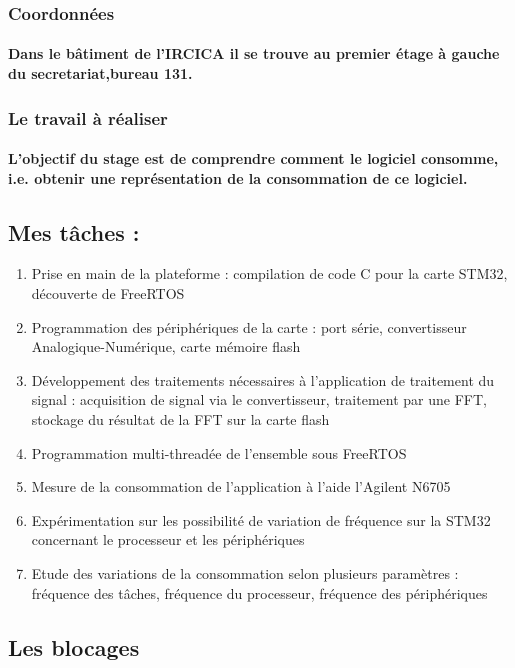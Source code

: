 \documentclass[a4paper]{article}
\begin{document}
\subsubsection{Coordonnées}
    \paragraph{Dans le bâtiment de l'IRCICA il se trouve au premier étage à gauche du secretariat,bureau 131.}
    
 \subsubsection{Le travail à réaliser}
    \paragraph{L'objectif du stage est de comprendre comment le logiciel consomme, i.e.
obtenir une représentation de la consommation de ce logiciel.} 
    
\subsection{Mes tâches :}
\begin{enumerate}
\item {Prise en main de la plateforme : compilation de code C pour la carte STM32, découverte de FreeRTOS}
\item {Programmation des périphériques de la carte : port série,
convertisseur Analogique-Numérique, carte mémoire flash}
\item {Développement des traitements nécessaires à l'application de
traitement du signal : acquisition de signal via le convertisseur,
traitement par une FFT, stockage du résultat de la FFT sur la carte
flash}
\item { Programmation multi-threadée de l'ensemble sous FreeRTOS}
\item {Mesure de la consommation de l'application à l'aide l'Agilent
N6705}
\item {Expérimentation sur les possibilité de variation de fréquence sur la
STM32 concernant le processeur et les périphériques}
\item {Etude des variations de la consommation selon plusieurs paramètres :
fréquence des tâches, fréquence du processeur, fréquence des
périphériques}
\end{enumerate}

\subsection{Les blocages}
\end{document}
